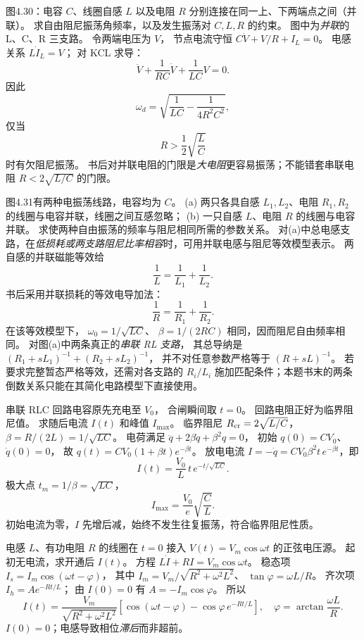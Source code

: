 图4.30：电容 $C$、线圈自感 $L$ 以及电阻 $R$ 分别连接在同一上、下两端点之间（并联）。
求自由阻尼振荡角频率，以及发生振荡对 $C,L,R$ 的约束。
\exsolution
图中为\emph{并联}的 L、C、R 三支路。
令两端电压为 $V$，
节点电流守恒
$C\dot V+V/R+I_L=0$。
电感关系 $L\dot I_L=V$；
对 KCL 求导：
\[
\ddot V+\frac1{RC}\dot V+\frac1{LC}V=0.
\]
因此
\[
\boxed{\omega_d=
\sqrt{\frac1{LC}-\frac1{4R^2C^2}}},
\]
仅当
\[
\boxed{R>\frac12\sqrt{\frac LC}}
\]
时有欠阻尼振荡。
\excheck 书后对并联电阻的门限是\emph{大电阻}更容易振荡；不能错套串联电阻 $R<2\sqrt{L/C}$ 的门限。

图4.31有两种电振荡线路，电容均为 $C$。
(a) 两只各具自感 $L_1,L_2$、电阻 $R_1,R_2$ 的线圈与电容并联，线圈之间互感忽略；
(b) 一只自感 $L$、电阻 $R$ 的线圈与电容并联。
求使两种自由振荡的频率与阻尼相同所需的参数关系。
\exsolution
对(a)中总电感支路，在\emph{低损耗或两支路阻尼比率相容}时，可用并联电感与阻尼等效模型表示。
两自感的并联磁能等效给
\[
\boxed{\frac1L=\frac1{L_1}+\frac1{L_2}}.
\]
书后采用并联损耗的等效电导加法：
\[
\boxed{\frac1R=\frac1{R_1}+\frac1{R_2}}.
\]
在该等效模型下，
$\omega_0=1/\sqrt{LC}$、
$\beta=1/(2RC)$ 相同，因而阻尼自由频率相同。
\excheck 对图(a)中两条真正的\emph{串联 RL 支路}，
其总导纳是
$(R_1+sL_1)^{-1}+(R_2+sL_2)^{-1}$，
并不对任意参数严格等于
$(R+sL)^{-1}$。
若要求完整暂态严格等效，还需对各支路的 $R_i/L_i$ 施加匹配条件；本题书末的两条倒数关系只能在其简化电路模型下直接使用。

串联 RLC 回路电容原先充电至 $V_0$，
合闸瞬间取 $t=0$。
回路电阻正好为临界阻尼值。
求随后电流 $I(t)$ 和峰值 $I_{\max}$。
\exsolution
临界阻尼
$R_{\rm cr}=2\sqrt{L/C}$，
$\beta=R/(2L)=1/\sqrt{LC}$。
电荷满足
$\ddot q+2\beta\dot q+\beta^2q=0$，
初始 $q(0)=CV_0$、$\dot q(0)=0$，
故
$q(t)=CV_0(1+\beta t)e^{-\beta t}$。
放电电流
$I=-\dot q=CV_0\beta^2 t\,e^{-\beta t}$，即
\[
\boxed{I(t)=\frac{V_0}{L}\,t\,
e^{-t/\sqrt{LC}}}.
\]
极大点 $t_m=1/\beta=\sqrt{LC}$，
\[
\boxed{I_{\max}=\frac{V_0}{e}\sqrt{\frac CL}}.
\]
\excheck 初始电流为零，$I$ 先增后减，始终不发生往复振荡，符合临界阻尼性质。

电感 $L$、有功电阻 $R$ 的线圈在 $t=0$ 接入
$V(t)=V_m\cos\omega t$ 的正弦电压源。
起初无电流，求开通后 $I(t)$。
\exsolution
方程
$L\dot I+RI=V_m\cos\omega t$。
稳态项
$I_s=I_m\cos(\omega t-\varphi)$，
其中
$I_m=V_m/\sqrt{R^2+\omega^2L^2}$、
$\tan\varphi=\omega L/R$。
齐次项 $I_h=Ae^{-Rt/L}$；
由 $I(0)=0$ 有
$A=-I_m\cos\varphi$。
所以
\[
\boxed{I(t)=\frac{V_m}{\sqrt{R^2+\omega^2L^2}}
\left[\cos(\omega t-\varphi)
-\cos\varphi\,e^{-Rt/L}\right]},
\quad
\varphi=\arctan\frac{\omega L}{R}.
\]
\excheck $I(0)=0$；电感导致相位\emph{滞后}而非超前。

